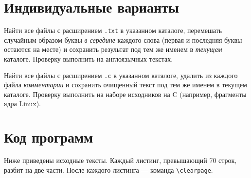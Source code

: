 \documentclass[a4paper, 14pt]{extarticle}
\begin{document}
\section{Индивидуальные варианты}\label{sect:variant}

\begin{description}[leftmargin=0pt]
  \item[Вариант A.] Найти все файлы с расширением \texttt{.txt} в указанном каталоге,
        перемешать случайным образом буквы \emph{в середине} каждого слова
        (первая и последняя буквы остаются на месте) и сохранить результат
        под тем же именем в \emph{текущем} каталоге.
        Проверку выполнить на англоязычных текстах.
  \item[Вариант B.] Найти все файлы с расширением \texttt{.c} в указанном каталоге,
        удалить из каждого файла \emph{комментарии} и сохранить
        очищенный текст под тем же именем в текущем каталоге.
        Проверку выполнить на наборе исходников на C
        (например, фрагменты ядра Linux).
\end{description}

\section{Код программ}\label{sect:listings}
Ниже приведены исходные тексты.  
Каждый листинг, превышающий 70 строк, разбит на две части.
После каждого листинга — команда \verb|\clearpage|.
\end{document}
